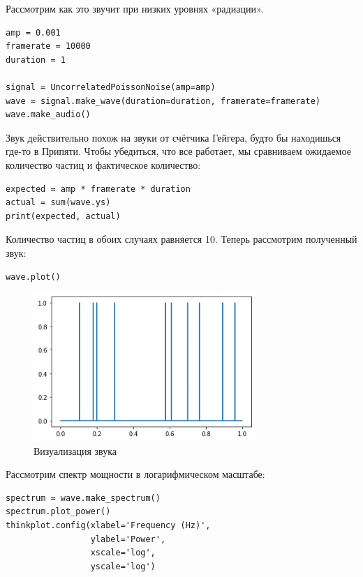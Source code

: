 \documentclass[a4paper,12pt]{report}
\begin{document}
Рассмотрим как это звучит при низких уровнях «радиации».

\begin{lstlisting}[caption=Создание звука]
amp = 0.001
framerate = 10000
duration = 1

signal = UncorrelatedPoissonNoise(amp=amp)
wave = signal.make_wave(duration=duration, framerate=framerate)
wave.make_audio()
\end{lstlisting}

Звук действительно похож на звуки от счётчика Гейгера, будто бы находишься где-то в Припяти. Чтобы убедиться, что все работает, мы сравниваем ожидаемое количество частиц и фактическое количество:

\begin{lstlisting}[caption=Создание звука]
expected = amp * framerate * duration
actual = sum(wave.ys)
print(expected, actual)
\end{lstlisting}

Количество частиц в обоих случаях равняется 10. Теперь рассмотрим полученный звук:

\begin{lstlisting}[caption=Визуализация звука]
wave.plot()
\end{lstlisting}

\begin{figure}[H]
        \centering
        \includegraphics[width=0.75\textwidth]{lab4_fig4_1.png}
        \caption{Визуализация звука}
        \label{fig:lab4_fig4_1}
\end{figure}

Рассмотрим спектр мощности в логарифмическом масштабе:

\begin{lstlisting}[caption=Спектр мощности звука]
spectrum = wave.make_spectrum()
spectrum.plot_power()
thinkplot.config(xlabel='Frequency (Hz)',
                 ylabel='Power',
                 xscale='log', 
                 yscale='log')
\end{lstlisting}
\end{document}
